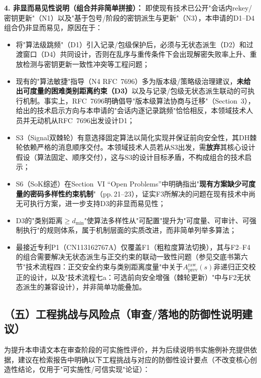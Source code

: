 \documentclass[12pt,a4paper]{article}
\begin{document}
\textbf{4. 非显而易见性说明（组合并非简单拼接）：}
即使现有技术已公开"会话内rekey/密钥更新"（N1）以及"基于包号/阶段的密钥派生与更新"（N3），本申请的D1--D4组合仍非显而易见，原因在于：
\begin{itemize}[leftmargin=2em]
    \item 将"算法级跳频"（D1）引入记录/包级保护后，必须与无状态派生（D2）和过渡窗口（D4）共同设计，否则在乱序与重传条件下会出现解密失败率上升、重放检测与密钥更新一致性冲突等工程问题；
    \item 现有的"算法敏捷"指导（N4 RFC~7696）多为版本级/策略级治理建议，\textbf{未给出可度量的困难类别距离约束（D3）}以及与记录/包级无状态派生联动的可执行机制。事实上，RFC~7696明确倡导"版本级算法协商与迁移"（Section~3），给出的技术启示方向与本申请的"会话内逐记录跳频"恰恰相反，本领域技术人员并无动机从RFC~7696出发设计D1；
    \item S3（Signal双棘轮）有意选择固定算法以简化实现并保证前向安全性，其DH棘轮依赖严格的消息顺序交付。本领域技术人员若从S3出发，需\textbf{放弃}其核心设计假设（算法固定、顺序交付），这与S3的设计目标矛盾，不构成组合的技术启示；
    \item S6（SoK综述）在Section~VI ``Open Problems''中明确指出"\textbf{现有方案缺少可度量的密码多样性约束机制}"（pp.\,21--23），证实F3所解决的问题在现有技术中尚无可执行方案，进一步支持D3的非显而易见性；
    \item D3的"类别距离$\ge d_{\min}$"使算法多样性从"可配置"提升为"可度量、可审计、可强制执行"的规则体系，属于机制层面的实质改进，而非简单列举多算法；
    \item 最接近专利P1（CN113162767A）仅覆盖F1（粗粒度算法切换），其与F2--F4的组合需要解决无状态派生与正交约束的联动一致性问题（参见交底书第六节"技术流程四：正交安全约束与类别距离度量"中关于$A_{\text{prev}}^{\text{raw}}(s)$非递归正交校正的设计，以及"技术流程七a：可选前向安全增强（棘轮更新）"中与F2无状态派生的兼容设计），并非简单功能叠加。
\end{itemize}

\subsection*{（五）工程挑战与风险点（审查/落地的防御性说明建议）}

为提升本申请文本在审查阶段的可实施性评价，并为后续说明书实施例补充提供依据，建议在检索报告中明确以下工程挑战与对应的防御性设计要点（不改变核心创造性结论，仅用于"可实施性/可信实现"论证）：
\end{document}
